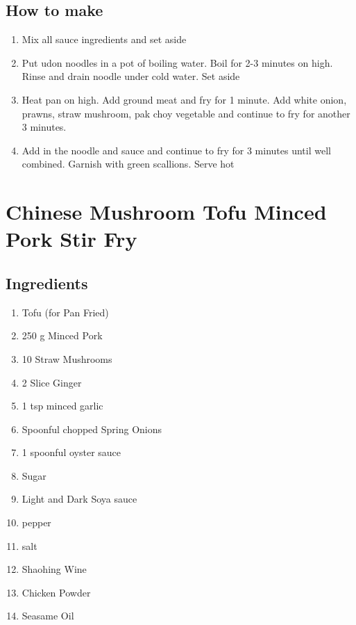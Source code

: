 \subsection{How to make}
\begin{enumerate}
    \item Mix all sauce ingredients and set aside
    \item Put udon noodles in a pot of boiling water. Boil for 2-3 minutes on high. Rinse and drain noodle under cold water. Set aside
    \item Heat pan on high. Add ground meat and fry for 1 minute. Add white onion, prawns, straw mushroom, pak choy vegetable and continue to fry for another 3 minutes.
    \item Add in the noodle and sauce and continue to fry for 3 minutes until well combined. Garnish with green scallions. Serve hot
\end{enumerate}
\section{Chinese Mushroom Tofu Minced Pork Stir Fry}
\subsection{Ingredients}
\begin{enumerate}
    \item Tofu (for Pan Fried)
    \item 250 g Minced Pork
    \item 10 Straw Mushrooms
    \item 2 Slice Ginger
    \item 1 tsp minced garlic
    \item Spoonful chopped Spring Onions
    \item 1 spoonful oyster sauce
    \item Sugar
    \item Light and Dark Soya sauce
    \item pepper
    \item salt
    \item Shaohing Wine
    \item Chicken Powder
    \item Seasame Oil
\end{enumerate}
